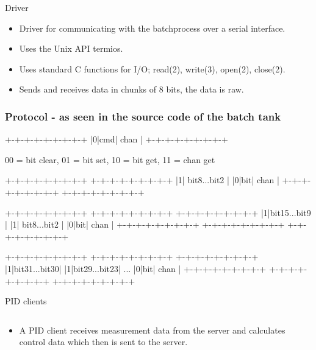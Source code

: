 \documentclass{beamer}
\begin{document}
\begin{frame}{Driver}
        \begin{itemize}
            \item Driver for communicating with the batchprocess over a serial interface.
            \item Uses the Unix API termios.
            \item Uses standard C functions for I/O; read(2), write(3), open(2), close(2).
            \item Sends and receives data in chunks of 8 bits, the data is raw.   
        \end{itemize}
\end{frame}

\begin{frame}[fragile]
    \frametitle{Protocol - as seen in the source code of the batch tank}
        \small
\begin{semiverbatim}
+-+-+-+-+-+-+-+-+
|0|cmd|  chan   | 
+-+-+-+-+-+-+-+-+

00 = bit clear, 01 = bit set, 10 = bit get, 11 = chan get

+-+-+-+-+-+-+-+-+  +-+-+-+-+-+-+-+-+ 
|1| bit8...bit2 |  |0|bit|  chan   |
+-+-+-+-+-+-+-+-+  +-+-+-+-+-+-+-+-+ 

+-+-+-+-+-+-+-+-+  +-+-+-+-+-+-+-+-+  +-+-+-+-+-+-+-+-+ 
|1|bit15...bit9 |  |1| bit8...bit2 |  |0|bit|  chan   |
+-+-+-+-+-+-+-+-+  +-+-+-+-+-+-+-+-+  +-+-+-+-+-+-+-+-+ 
 
+-+-+-+-+-+-+-+-+  +-+-+-+-+-+-+-+-+     +-+-+-+-+-+-+-+-+ 
|1|bit31...bit30|  |1|bit29...bit23| ... |0|bit|  chan   |
+-+-+-+-+-+-+-+-+  +-+-+-+-+-+-+-+-+     +-+-+-+-+-+-+-+-+ 
\end{semiverbatim}
\end{frame}

\begin{frame}{PID clients}
\begin{columns}[T]
    \begin{column}{.55\textwidth}
        \begin{itemize}
            \item A PID client receives measurement data from the server and calculates control data which then is sent to the server.            
        \end{itemize}
    \end{column}
    \end{columns}
\end{frame}
\end{document}
